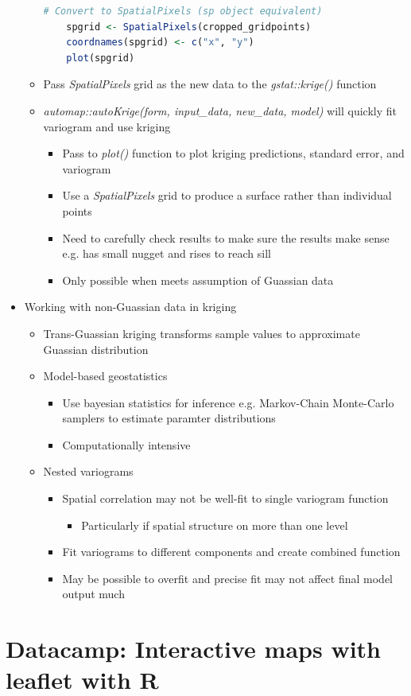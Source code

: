 \documentclass{article}
\begin{document}
\begin{itemize}
\begin{itemize}
\begin{lstlisting}[language=R]
    # Convert to SpatialPixels (sp object equivalent)
    spgrid <- SpatialPixels(cropped_gridpoints)
    coordnames(spgrid) <- c("x", "y")
    plot(spgrid)
\end{lstlisting}

        \item Pass \textit{SpatialPixels} grid as the new data to the \textit{gstat::krige()} function
        \item \textit{automap::autoKrige(form, input\_data, new\_data, model)} will quickly fit variogram and use kriging
        \begin{itemize}
            \item Pass to \textit{plot()} function to plot kriging predictions, standard error, and variogram
            \item Use a \textit{SpatialPixels} grid to produce a surface rather than individual points
            \item Need to carefully check results to make sure the results make sense e.g. has small nugget and rises to reach sill
            \item Only possible when meets assumption of Guassian data
        \end{itemize}
    \end{itemize}
    \item Working with non-Guassian data in kriging
    \begin{itemize}
        \item Trans-Guassian kriging transforms sample values to approximate Guassian distribution
        \item Model-based geostatistics
        \begin{itemize}
            \item Use bayesian statistics for inference e.g. Markov-Chain Monte-Carlo samplers to estimate paramter distributions
            \item Computationally intensive
        \end{itemize}
        \item Nested variograms
        \begin{itemize}
            \item Spatial correlation may not be well-fit to single variogram function
            \begin{itemize}
                \item Particularly if spatial structure on more than one level
            \end{itemize}
            \item Fit variograms to different components and create combined function
            \item May be possible to overfit and precise fit may not affect final model output much
        \end{itemize}
    \end{itemize}
\end{itemize}





\section{Datacamp: Interactive maps with leaflet with R}
\end{document}
